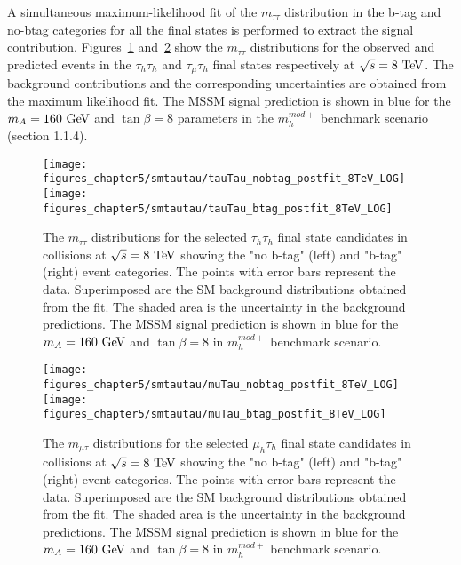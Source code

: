 A simultaneous maximum-likelihood fit of the $m_{\tau\tau}$ distribution in the b-tag and no-btag categories for all the final states is performed to extract the signal contribution. Figures~\ref{fig:mssmtauhtauh} and~\ref{fig:mssmmutauh} show the $m_{\tau\tau}$ distributions for the observed and predicted events in the $\tau_h\tau_h$ and $\tau_{\mu}\tau_h$ final states respectively at $\sqrt{s}=8~\mathrm{Te\kern -0.1em V}$.  The background contributions and the corresponding uncertainties are obtained from the maximum likelihood fit. The MSSM signal prediction is shown in blue for the $m_{A}=160~\mathrm{Ge\kern -0.1em V}$ and $\tan\beta = 8$ parameters in the $m_{h}^{mod+}$ benchmark scenario (section 1.1.4). 
\begin{figure}[htbp]
\centering
\texttt{[image: figures\_chapter5/smtautau/tauTau\_nobtag\_postfit\_8TeV\_LOG]}
\texttt{[image: figures\_chapter5/smtautau/tauTau\_btag\_postfit\_8TeV\_LOG]}
\caption{The $m_{\tau\tau}$ distributions for the selected $\tau_{h}\tau_{h}$ final state candidates in collisions at $\sqrt{s}=8~\mathrm{Te\kern -0.1em V}$ showing the "no b-tag" (left) and "b-tag" (right) event categories. The points with error bars represent the data. Superimposed are the SM background distributions obtained from the fit. The shaded area is the uncertainty in the background predictions. The MSSM signal prediction is shown in blue for the $m_{A}=160~\mathrm{Ge\kern -0.1em V}$ and $\tan \beta=8$ in $m_{h}^{mod+}$ benchmark scenario.}
\label{fig:mssmtauhtauh}
\end{figure}
\begin{figure}[htbp]
\centering
\texttt{[image: figures\_chapter5/smtautau/muTau\_nobtag\_postfit\_8TeV\_LOG]}
\texttt{[image: figures\_chapter5/smtautau/muTau\_btag\_postfit\_8TeV\_LOG]}
\caption{The $m_{\mu\tau}$ distributions for the selected $\mu_{h}\tau_{h}$ final state candidates in collisions at $\sqrt{s}=8~\mathrm{Te\kern -0.1em V}$ showing the "no b-tag" (left) and "b-tag" (right) event categories. The points with error bars represent the data. Superimposed are the SM background distributions obtained from the fit. The shaded area is the uncertainty in the background predictions. The MSSM signal prediction is shown in blue for the $m_{A}=160~\mathrm{Ge\kern -0.1em V}$ and $\tan \beta=8$ in $m_{h}^{mod+}$ benchmark scenario.}
\label{fig:mssmmutauh}
\end{figure}

